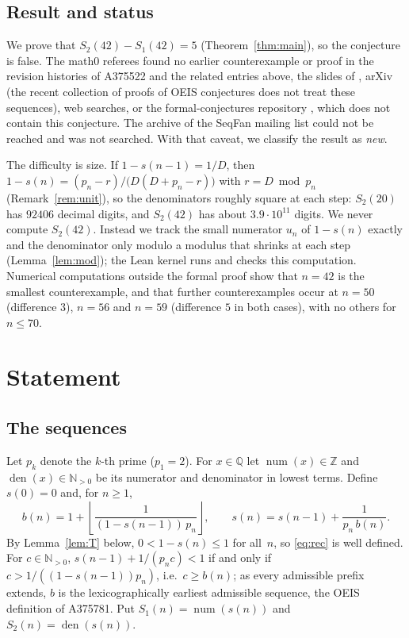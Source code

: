 \documentclass[11pt]{amsart}
\theoremstyle{plain}
\theoremstyle{definition}
\newcommand{\N}{\mathbb{N}}
\newcommand{\Z}{\mathbb{Z}}
\newcommand{\Q}{\mathbb{Q}}
\DeclareMathOperator{\num}{num}
\DeclareMathOperator{\den}{den}
\newcommand{\fl}[1]{\left\lfloor #1\right\rfloor}
\begin{document}
\subsection*{Result and status}
We prove that $S_2(42)-S_1(42)=5$ (Theorem~\ref{thm:main}), so the conjecture is false.
The math0 referees found no earlier counterexample or proof in the revision histories of A375522 and the related entries above, the slides of \cite{SloaneTalk}, arXiv (the recent collection \cite{Fried} of proofs of OEIS conjectures does not treat these sequences), web searches, or the formal-conjectures repository \cite{FC}, which does not contain this conjecture. The archive of the SeqFan mailing list could not be reached and was not searched. With that caveat, we classify the result as \emph{new}.

The difficulty is size. If $1-s(n-1)=1/D$, then $1-s(n)=(p_n-r)/\bigl(D(D+p_n-r)\bigr)$ with $r=D\bmod p_n$ (Remark~\ref{rem:unit}), so the denominators roughly square at each step: $S_2(20)$ has $92406$ decimal digits, and $S_2(42)$ has about $3.9\cdot10^{11}$ digits. We never compute $S_2(42)$. Instead we track the small numerator $u_n$ of $1-s(n)$ exactly and the denominator only modulo a modulus that shrinks at each step (Lemma~\ref{lem:mod}); the Lean kernel runs and checks this computation.
Numerical computations outside the formal proof show that $n=42$ is the smallest counterexample, and that further counterexamples occur at $n=50$ (difference $3$), $n=56$ and $n=59$ (difference $5$ in both cases), with no others for $n\le 70$.

\section{Statement}\label{sec:statement}

\subsection{The sequences}
Let $p_k$ denote the $k$-th prime ($p_1=2$). For $x\in\Q$ let $\num(x)\in\Z$ and $\den(x)\in\N_{>0}$ be its numerator and denominator in lowest terms. Define $s(0)=0$ and, for $n\ge1$,
\begin{equation}\label{eq:rec}
  b(n)=1+\fl{\frac{1}{(1-s(n-1))\,p_n}},\qquad s(n)=s(n-1)+\frac{1}{p_n\,b(n)}.
\end{equation}
By Lemma~\ref{lem:T} below, $0<1-s(n)\le 1$ for all~$n$, so \eqref{eq:rec} is well defined.
For $c\in\N_{>0}$, $s(n-1)+1/(p_nc)<1$ if and only if $c>1/((1-s(n-1))p_n)$, i.e.\ $c\ge b(n)$; as every admissible prefix extends, $b$ is the lexicographically earliest admissible sequence, the OEIS definition of A375781. Put $S_1(n)=\num(s(n))$ and $S_2(n)=\den(s(n))$.
\end{document}
